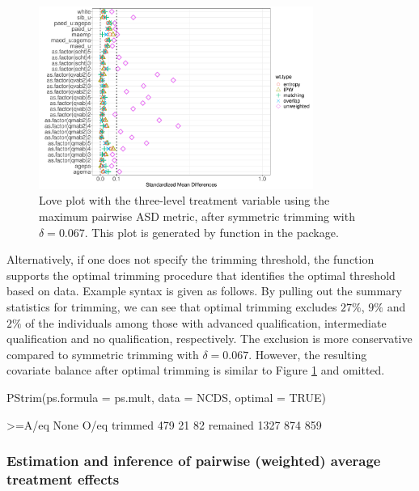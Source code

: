 \begin{figure}[ht]
\centering
\includegraphics[width=0.8\textwidth]{figure/multasdtrim.pdf}
\caption{Love plot with the three-level treatment variable  using the maximum pairwise ASD metric, after symmetric trimming with $\delta=0.067$. This plot is generated by  function in the  package.}\label{fig:mult4}
\end{figure}

Alternatively, if one does not specify the trimming threshold, the  function supports the optimal trimming procedure that identifies the optimal threshold based on data. Example syntax is given as follows. By pulling out the summary statistics for trimming, we can see that optimal trimming excludes $27\%$, $9\%$ and $2\%$ of the individuals among those with advanced qualification, intermediate qualification and no qualification, respectively. The exclusion is more conservative compared to symmetric trimming with $\delta=0.067$. However, the resulting covariate balance after optimal trimming is similar to Figure \ref{fig:mult4} and omitted.

\begin{example}
PStrim(ps.formula = ps.mult, data = NCDS, optimal = TRUE)
\end{example}

\begin{Soutput} 
         >=A/eq None O/eq
trimmed     479   21   82
remained   1327  874  859
\end{Soutput} 

\subsubsection{Estimation and inference of pairwise (weighted) average treatment effects}

